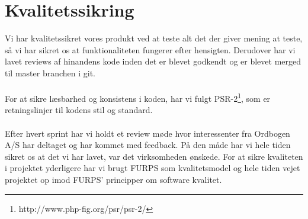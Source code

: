 \hypertarget{kvalitetssikring}{}
\section{Kvalitetssikring}
Vi har kvalitetssikret vores produkt ved at teste alt det der giver mening at teste,
så vi har sikret os at funktionaliteten fungerer efter hensigten. Derudover har vi lavet reviews af hinandens kode inden
det er blevet godkendt og er blevet merged til master branchen i git.
\\\\
For at sikre læsbarhed og konsistens i koden, har vi fulgt PSR-2\footnote{http://www.php-fig.org/psr/psr-2/}, som er retningslinjer til kodens stil og standard.
\\\\
Efter hvert sprint har vi holdt et review møde hvor interessenter fra Ordbogen A/S har deltaget og har kommet med feedback.
På den måde har vi hele tiden sikret os at det vi har lavet, var det virksomheden ønskede.
For at sikre kvaliteten i projektet yderligere har vi brugt FURPS som kvalitetsmodel og hele tiden
vejet projektet op imod FURPS' principper om software kvalitet.
